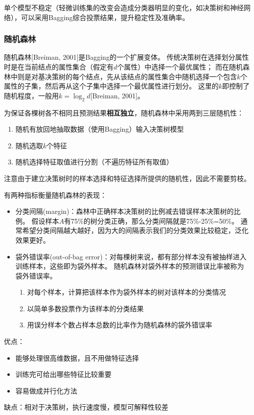 单个模型不稳定（轻微训练集的改变会造成分类器明显的变化，如决策树和神经网络），可以采用Bagging综合投票结果，提升稳定性及准确率。

\subsubsection{随机森林}
随机森林[Breiman, 2001]是Bagging的一个扩展变体。
传统决策树在选择划分属性时是在当前结点的属性集合（假定有$d$个属性）中选择一个最优属性；
而在随机森林中则是对基决策树的每个结点，先从该结点的属性集合中随机选择一个包含$k$个属性的子集，然后再从这个子集中选择一个最优属性进行划分。
这里的$k$即控制了随机程度，一般用$k=\log_2 d$[Breiman, 2001]。

为保证各棵树各不相同且预测结果\textbf{相互独立}，随机森林中采用两到三层随机性：
\begin{enumerate}
	\item 随机有放回地抽取数据（使用Bagging）输入决策树模型
	\item 随机选取$k$个特征
	\item 随机选择特征取值进行分割（不遍历特征所有取值）
\end{enumerate}
注意由于建立决策树时的样本选择和特征选择所提供的随机性，因此不需要剪枝。

有两种指标衡量随机森林的表现：
\begin{itemize}
	\item 分类间隔(margin)：森林中正确样本决策树的比例减去错误样本决策树的比例。
	假设样本$A$有75\%的树分类正确，那么分类间隔就是75\%-25\%=50\%。
	通常希望分类间隔越大越好，因为大的间隔表示我们的分类效果比较稳定，泛化效果更好。
	\item 袋外错误率(out-of-bag error)：对每棵树来说，都有部分样本没有被抽样进入训练样本，这些即为袋外样本。
	随机森林对袋外样本的预测错误比率被称为袋外错误率。
	\begin{enumerate}
		\item 对每个样本，计算把该样本作为袋外样本的树对该样本的分类情况
		\item 以简单多数投票作为该样本的分类结果
		\item 用误分样本个数占样本总数的比率作为随机森林的袋外错误率
	\end{enumerate}
\end{itemize}

优点：
\begin{itemize}
\item 能够处理很高维数据，且不用做特征选择
\item 训练完可给出哪些特征比较重要
\item 容易做成并行化方法
\end{itemize}
缺点：相对于决策树，执行速度慢，模型可解释性较差

